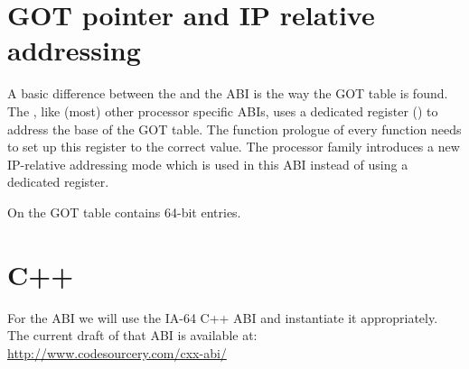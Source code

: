 


\section{GOT pointer and IP relative addressing}

A basic difference between the \intelabi and the \xARCH ABI is the
way the GOT table is found.  The \intelabi, like (most) other processor
specific ABIs, uses a dedicated register () to address the
base of the GOT table.  The function prologue of every function needs
to set up this register to the correct value.  The \xARCH processor
family introduces a new IP-relative addressing mode which is used in
this ABI instead of using a dedicated register.

On \xARCH the GOT table contains 64-bit entries.


\section{C++\label{section-cpp}}

For the  ABI we will use the IA-64 C++ ABI and instantiate it
appropriately.  The current draft of that ABI is available at:\\
\url{http://www.codesourcery.com/cxx-abi/}


